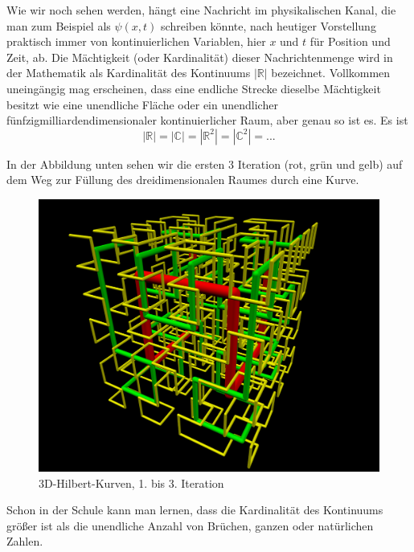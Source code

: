 \documentclass[12pt]{book}
\begin{document}
Wie wir noch sehen werden, hängt eine Nachricht im physikalischen Kanal, die man zum Beispiel als $\psi(x,t)$ schreiben könnte, nach heutiger Vorstellung praktisch immer von kontinuierlichen Variablen, hier $x$ und $t$ für Position und Zeit, ab. Die Mächtigkeit (oder Kardinalität) dieser Nachrichtenmenge wird in der Mathematik als Kardinalität des Kontinuums $|\mathbb{R}|$ bezeichnet. Vollkommen uneingängig mag erscheinen, dass eine endliche Strecke dieselbe Mächtigkeit besitzt wie eine unendliche Fläche oder ein unendlicher fünfzigmilliardendimensionaler kontinuierlicher Raum, aber genau so ist es. Es ist 
\begin{equation} 
|\mathbb{R}| = |\mathbb{C}| = |\mathbb{R}^2| = |\mathbb{C}^2| = \text{...}
\label{eq:cardinality_cont}
\end{equation}

In der Abbildung unten sehen wir die ersten 3 Iteration (rot, grün und gelb)
auf dem Weg zur Füllung des dreidimensionalen Raumes durch eine Kurve.

\begin{figure}[!h]\begin{center}
  \includegraphics[width=13cm]{Bilder/Hilbert_curve_3D_iterations_0-2.png}
  \caption{3D-Hilbert-Kurven, 1. bis 3. Iteration}
  \label{fig:Hilbert_curves}
\end{center}\end{figure}


Schon in der Schule kann man lernen, dass die Kardinalität des Kontinuums größer ist als die unendliche Anzahl von Brüchen, ganzen oder natürlichen Zahlen.
\end{document}
